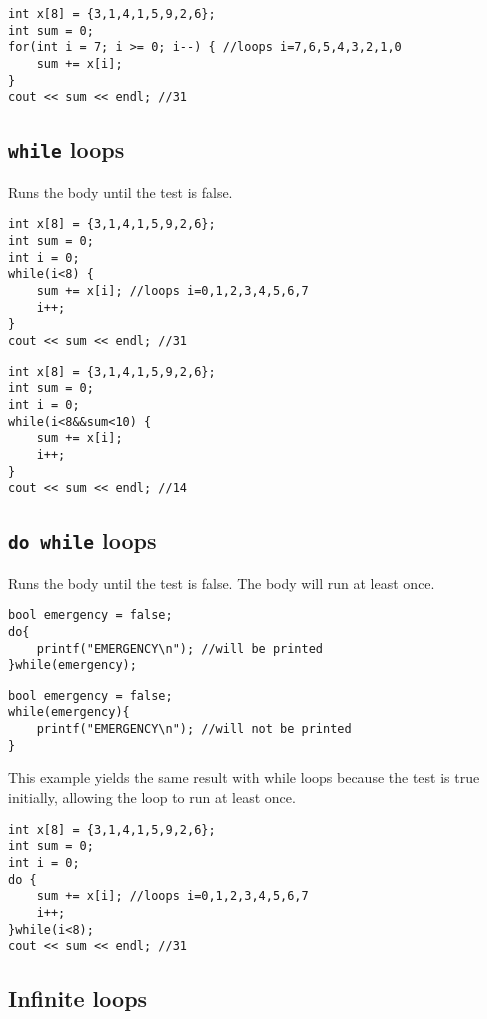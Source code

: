 \begin{lstlisting}
int x[8] = {3,1,4,1,5,9,2,6};
int sum = 0;
for(int i = 7; i >= 0; i--) { //loops i=7,6,5,4,3,2,1,0
    sum += x[i];
}
cout << sum << endl; //31
\end{lstlisting}

\subsection{\texttt{while} loops}
Runs the body until the test is false.
\begin{lstlisting}
int x[8] = {3,1,4,1,5,9,2,6};
int sum = 0;
int i = 0;
while(i<8) { 
    sum += x[i]; //loops i=0,1,2,3,4,5,6,7
    i++;
}
cout << sum << endl; //31
\end{lstlisting}

\begin{lstlisting}
int x[8] = {3,1,4,1,5,9,2,6};
int sum = 0;
int i = 0;
while(i<8&&sum<10) { 
    sum += x[i];
    i++;
}
cout << sum << endl; //14
\end{lstlisting}

\subsection{\texttt{do while} loops}
Runs the body until the test is false. The body will run at least once.

\begin{lstlisting}
bool emergency = false;
do{
    printf("EMERGENCY\n"); //will be printed
}while(emergency);
\end{lstlisting}

\begin{lstlisting}
bool emergency = false;
while(emergency){
    printf("EMERGENCY\n"); //will not be printed
}
\end{lstlisting}

This example yields the same result with while loops because the test is true initially, allowing the loop to run at least once.

\begin{lstlisting}
int x[8] = {3,1,4,1,5,9,2,6};
int sum = 0;
int i = 0;
do { 
    sum += x[i]; //loops i=0,1,2,3,4,5,6,7
    i++;
}while(i<8);
cout << sum << endl; //31
\end{lstlisting}

\subsection{Infinite loops}

